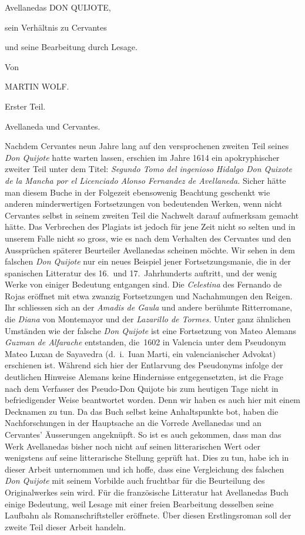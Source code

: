 
\centerline{Avellanedas DON QUIJOTE,}
\centerline{sein Verhältnis zu Cervantes}
\centerline{und seine Bearbeitung durch Lesage.}

\centerline{Von}
\centerline{MARTIN WOLF.}

\centerline{Erster Teil.}

\centerline{Avellaneda und Cervantes.}

Nachdem Cervantes neun Jahre lang auf den versprochenen zweiten
Teil seines {\it Don Quijote} hatte warten lassen, erschien im Jahre 1614
ein apokryphischer zweiter Teil unter dem Titel: {\it Segundo Tomo del
ingenioso Hidalgo Don Quixote de la Mancha por el Licenciado Alonso
Fernandez de Avellaneda.} Sicher hätte man diesem Buche in der
Folgezeit ebensowenig Beachtung geschenkt wie anderen minderwertigen
Fortsetzungen von bedeutenden Werken, wenn nicht Cervantes selbst
in seinem zweiten Teil die Nachwelt darauf aufmerksam gemacht hätte.
Das Verbrechen des Plagiats ist jedoch für jene Zeit nicht so selten
und in unserem Falle nicht so gross, wie es nach dem Verhalten des
Cervantes und den Aussprüchen späterer Beurteiler Avellanedas scheinen
möchte. Wir sehen in dem falschen {\it Don Quijote} nur ein neues
Beispiel jener Fortsetzungsmanie, die in der spanischen Litteratur des
16.~und 17.~Jahrhunderts auftritt, und der wenig Werke von einiger
Bedeutung entgangen sind. Die {\it Celestina} des Fernando de Rojas
eröffnet mit etwa zwanzig Fortsetzungen und Nachahmungen den Reigen.
Ihr schliessen sich an der {\it Amadis de Gaula} und andere berühmte
Ritterromane, die {\it Diana} von Montemayor und der {\it Lazarillo de Tormes.}
Unter ganz ähnlichen Umständen wie der falsche {\it Don Quijote} ist eine
Fortsetzung von Mateo Alemans {\it Guzman de Alfarache} entstanden,
die~1602 in Valencia unter dem Pseudonym
Mateo Luxan de Sayavedra
(d.~i.\ Iuan Marti, ein valencianischer Advokat) erschienen ist. Während
sich hier der Entlarvung des Pseudonyms infolge der deutlichen Hinweise
Alemans keine Hindernisse entgegensetzten, ist die Frage nach dem
Verfasser des Pseudo-Don Quijote bis zum heutigen Tage nicht in
befriedigender Weise beantwortet worden. Denn wir haben es auch hier
mit einem Decknamen zu tun. Da das Buch selbst keine Anhaltspunkte
bot, haben die Nachforschungen in der Hauptsache an die Vorrede
Avellanedas und an Cervantes' Äusserungen angeknüpft. So ist es auch
gekommen, dass man das Werk Avellanedas bisher noch nicht auf
seinen litterarischen Wert oder wenigstens auf seine litterarische Stellung
geprüft hat. Dies zu tun, habe ich in dieser Arbeit unternommen und
ich hoffe, dass eine Vergleichung des falschen {\it Don Quijote} mit seinem
Vorbilde auch fruchtbar für die Beurteilung des Originalwerkes sein
wird. Für die französische Litteratur hat Avellanedas Buch einige
Bedeutung, weil Lesage mit einer freien Bearbeitung desselben seine
Laufbahn als Romanschriftsteller eröffnete. Über diesen Erstlingsroman soll
der zweite Teil dieser Arbeit handeln.

